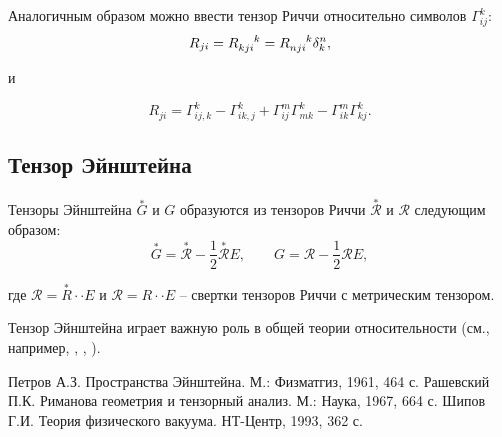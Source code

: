 \documentclass[14pt,a4paper]{scrartcl}
\begin{document}
Аналогичным образом можно ввести тензор Риччи относительно символов $\Gamma_{ij}^k$:
\begin{equation}\label{eq37}
	R_{ji} = R\indices{_{kji}^k} = R\indices{_{nji}^k} \delta_k^n,
\end{equation}

и

\begin{equation}\label{eq38}
	R_{ji} = \Gamma_{ij,k}^k - \Gamma_{ik,j}^k + \Gamma_{ij}^m \Gamma_{mk}^k - \Gamma_{ik}^m \Gamma_{kj}^k.
\end{equation}


\subsection{Тензор Эйнштейна}
Тензоры Эйнштейна $\overset{*}{G}$ и $G$ образуются из тензоров Риччи $\overset{*}{\mathcal{R}}$ и $\mathcal{R}$ следующим образом:
\begin{equation}\label{eq39}
	\overset{*}{G} = \overset{*}{\mathcal{R}} - \frac{1}{2}\overset{*}{\mathcal{R}}E, \qquad G = \mathcal{R} - \frac{1}{2}\mathcal{R}E,
\end{equation}

где $\mathcal{R} = \overset{*}{R} \cdot \cdot E$ и $\mathcal{R} = R \cdot \cdot E$ -- свертки тензоров Риччи с метрическим тензором.

Тензор Эйнштейна играет важную роль в общей теории относительности (см., например, \cite{Petrov}, \cite{Rashevskiy}, \cite{Shipov}).































\clearpage
{}
\begin{thebibliography}{3}
	Петров А.З. Пространства Эйнштейна. М.: Физматгиз, 1961, 464 с.
	Рашевский П.К. Риманова геометрия и тензорный анализ. М.: Наука, 1967, 664 с.
	Шипов Г.И. Теория физического вакуума. НТ-Центр, 1993, 362 с.
\end{thebibliography}
\end{document}
